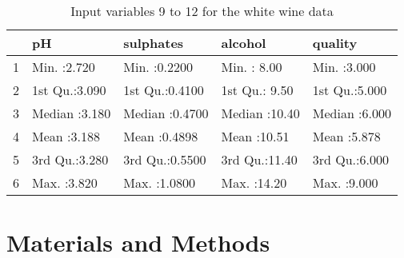 \documentclass[12pt]{article}
\begin{document}
\begin{center}
\begin{table}[htbp]
\centering
\begin{tabular}{rllll}
  \hline
 &       pH &   sulphates &    alcohol &    quality \\
  \hline
1 & Min.   :2.720   & Min.   :0.2200   & Min.   : 8.00   & Min.   :3.000   \\
  2 & 1st Qu.:3.090   & 1st Qu.:0.4100   & 1st Qu.: 9.50   & 1st Qu.:5.000   \\
  3 & Median :3.180   & Median :0.4700   & Median :10.40   & Median :6.000   \\
  4 & Mean   :3.188   & Mean   :0.4898   & Mean   :10.51   & Mean   :5.878   \\
  5 & 3rd Qu.:3.280   & 3rd Qu.:0.5500   & 3rd Qu.:11.40   & 3rd Qu.:6.000   \\
  6 & Max.   :3.820   & Max.   :1.0800   & Max.   :14.20   & Max.   :9.000   \\
   \hline
\end{tabular}
\caption{Input variables 9 to 12 for the white wine data}
\label{tab:summary5}
\end{table}\end{center}


\newpage



\section{Materials and Methods}
\end{document}
